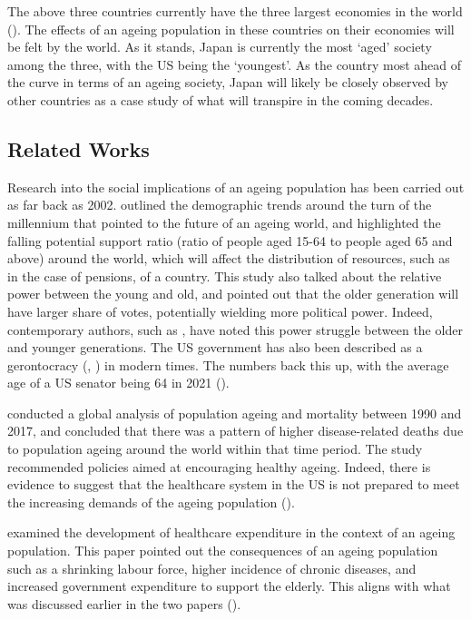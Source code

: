 \documentclass[11pt]{article}
\begin{document}
The above three countries currently have the three largest economies in the world (\cite{worldbankgdp}). The effects of an ageing population in these countries on their economies will be felt by the world. As it stands, Japan is currently the most `aged' society among the three, with the US being the `youngest'. As the country most ahead of the curve in terms of an ageing society, Japan will likely be closely observed by other countries as a case study of what will transpire in the coming decades.


\subsection*{Related Works}
Research into the social implications of an ageing population has been carried out as far back as 2002. \cite{tinker2002social} outlined the demographic trends around the turn of the millennium that pointed to the future of an ageing world, and highlighted the falling potential support ratio (ratio of people aged 15-64 to people aged 65 and above) around the world, which will affect the distribution of resources, such as in the case of pensions, of a country. This study also talked about the relative power between the young and old, and pointed out that the older generation will have larger share of votes, potentially wielding more political power. Indeed, contemporary authors, such as \cite{Munger+2022}, have noted this power struggle between the older and younger generations. The US government has also been described as a gerontocracy (\cite{noah_2019}, \cite{thompson_2020}) in modern times. The numbers back this up, with the average age of a US senator being 64 in 2021 (\cite{manning_2022}).

\cite{Cheng2020} conducted a global analysis of population ageing and mortality between 1990 and 2017, and concluded that there was a pattern of higher disease-related deaths due to population ageing around the world within that time period. The study recommended policies aimed at encouraging healthy ageing. Indeed, there is evidence to suggest that the healthcare system in the US is not prepared to meet the increasing demands of the ageing population (\cite{foley_retooling_2020}).

\cite{marevsova2015economics} examined the development of healthcare expenditure in the context of an ageing population. This paper pointed out the consequences of an ageing population such as a shrinking labour force, higher incidence of chronic diseases, and increased government expenditure to support the elderly. This aligns with what was discussed earlier in the two papers (\cite{tinker2002social,Cheng2020}).
\end{document}
